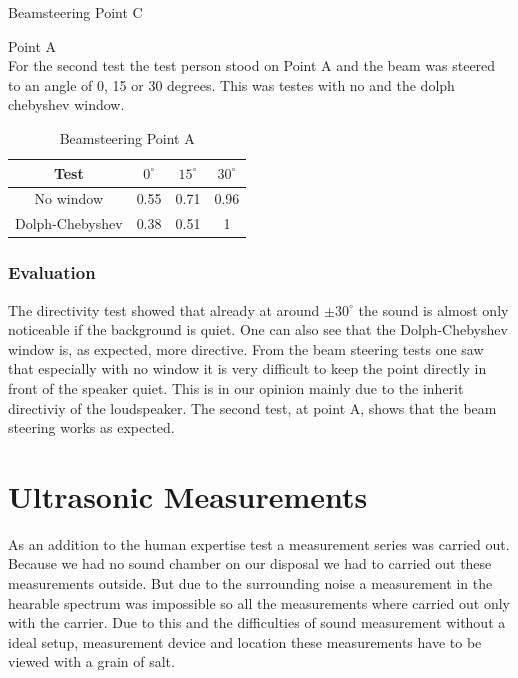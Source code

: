 \begin{enumerate}
\begin{center}
\begin{table}[h!]
    \caption{Beamsteering Point C}
    \label{6.1.3_tab:music_audio_volume_steering_c}
    \end{table}   
    \end{center}
     \subitem Point A\\
    For the second test the test person stood on Point A and the beam was steered to an angle of 0, 15 or 30 degrees. This was testes with no and the dolph chebyshev window.
    \begin{center}
     \begin{table}[h!]
    \centering
    \begin{tabular}{ |c|c|c|c|}
      \hline 
      Test & $0^\circ$ & $15^\circ$ & $30^\circ$ \\ 
      \hline
     No window & 0.55 & 0.71 & 0.96 \\
     \hline
     Dolph-Chebyshev & 0.38 & 0.51 & 1 \\
     \hline
    \end{tabular}
    \caption{Beamsteering Point A}
    \label{6.1.3_tab:music_audio_volume_steering_A}
    \end{table}   
    \end{center}
\end{enumerate}
\subsubsection{Evaluation}
The directivity test showed that already at around $\pm 30^\circ$ the sound is almost only noticeable if the background is quiet. One can also see that the Dolph-Chebyshev window is, as expected, more directive. From the beam steering tests one saw that especially with no window it is very difficult to keep the point directly in front of the speaker quiet. This is in our opinion mainly due to the inherit directiviy of the loudspeaker. The second test, at point A, shows that the beam steering works as expected.   
\section{Ultrasonic Measurements}\label{6_sec:ultrasonic}
As an addition to the human expertise test a measurement series was carried out. Because we had no sound chamber on our disposal we had to carried out these measurements outside. But due to the surrounding noise a measurement in the hearable spectrum was impossible so all the measurements where carried out only with the carrier. Due to this and the difficulties of sound measurement without a ideal setup, measurement device and location these measurements have to be viewed with a grain of salt.
